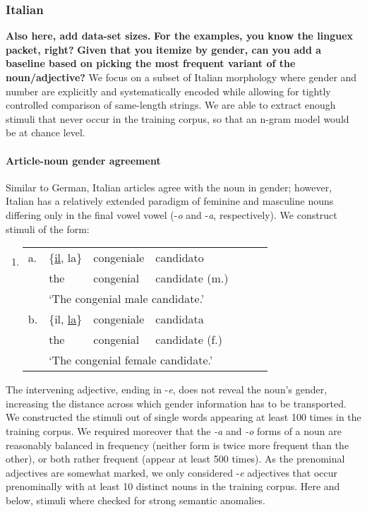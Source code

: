 
\subsubsection{Italian} \textbf{Also here, add data-set sizes.}
\textbf{For the examples, you know the linguex packet, right?}
\textbf{Given that you itemize by gender, can you add a baseline based
  on picking the most frequent variant of the noun/adjective?} We
focus on a subset of Italian morphology where gender and number are
explicitly and systematically encoded while allowing for tightly
controlled comparison of same-length strings. We are able to extract
enough stimuli that never occur in the training corpus, so that an
n-gram model would be at chance level.

\paragraph{Article-noun gender agreement}

Similar to German, Italian articles agree with the noun in gender; however, Italian has a relatively extended paradigm of feminine and masculine nouns differing only in the final vowel vowel (-\emph{o} and -\emph{a}, respectively). We construct stimuli of the form:
\begin{enumerate}[label={(\arabic*)}]
	\item 
		\begin{tabular}[t]{lllllll}
	a. & \{\underline{il}, la\} & congeniale & candidato \\
   &  the & congenial & candidate (m.) \\
	& \multicolumn{4}{l}{`The congenial male candidate.'} \\
	b. & \{il, \underline{la}\} & congeniale & candidata \\
    &the & congenial & candidate (f.) \\
	& \multicolumn{4}{l}{`The congenial female candidate.'} \\
\end{tabular}
\end{enumerate}

The intervening adjective, ending in -\emph{e}, does not reveal the
noun's gender, increasing the distance across which gender information
has to be transported. We constructed the stimuli out of single words
appearing at least 100 times in the training corpus. We required
moreover that the \emph{-a} and \emph{-o} forms of a noun are
reasonably balanced in frequency (neither form is twice more frequent
than the other), or both rather frequent (appear at least 500
times). As the prenominal adjectives are somewhat marked, we only
considered -\emph{e} adjectives that occur prenominally with at least
10 distinct nouns in the training corpus. Here and below, stimuli
where checked for strong semantic anomalies.

